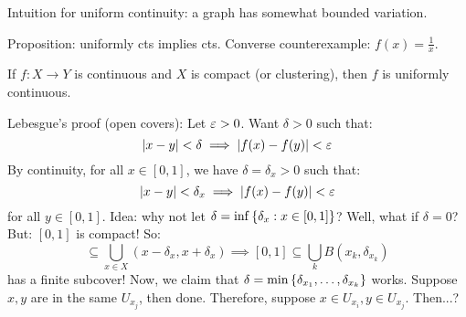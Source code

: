 \documentclass{article}
\begin{document}
Intuition for uniform continuity: a graph has somewhat bounded variation.

Proposition: uniformly cts implies cts.
Converse counterexample: $ f(x) = \frac{1}{x} $.

\newpage
\begin{thm}[title=Free Upgrade Theorem]
    If $ f : X \rightarrow Y $ is continuous and $ X $ is compact (or clustering),
    then $ f $ is uniformly continuous.
\end{thm}

\begin{pf}[source=Primary Source Material]
    Lebesgue's proof (open covers): \vsp
    Let $ \operatorname{\varepsilon} > 0 $. Want $ \delta > 0 $ such that:
    \begin{equation*}
        \abs{x - y} < \delta \implies \abs{f(x) - f(y)} < \operatorname{\varepsilon}
    \end{equation*}
    By continuity, for all $ x \in [0, 1] $, we have $ \delta = \delta_{x} > 0 $ such that:
    \begin{equation*}
        \abs{x - y} < \delta_{x} \implies \abs{f(x) - f(y)} < \operatorname{\varepsilon}
    \end{equation*}
    for all $ y \in [0, 1] $.
    Idea: why not let $ \delta = \inf\left\{{\delta_{x} : x \in [0, 1]}\right\} $?
    Well, what if $ \delta = 0 $?
    But: $ [0, 1] $ is compact! So:
    \begin{equation*}
        [0, 1] \subseteq \bigcup_{x \in X} (x-\delta_{x}, x + \delta_{x})
        \implies [0, 1] \subseteq \bigcup_{k} B(x_{k}, \delta_{x_{k}})
    \end{equation*}
    has a finite subcover!
    Now, we claim that $ \delta = \min \left\{{\delta_{x_{1}}, \dots, \delta_{x_{k}}}\right\} $ works. \vsp
    Suppose $ x, y $ are in the same $ U_{x_{j}} $, then done.
    Therefore, suppose $ x \in U_{x_{i}}, y \in U_{x_{j}} $. Then...?
\end{pf}
\end{document}
